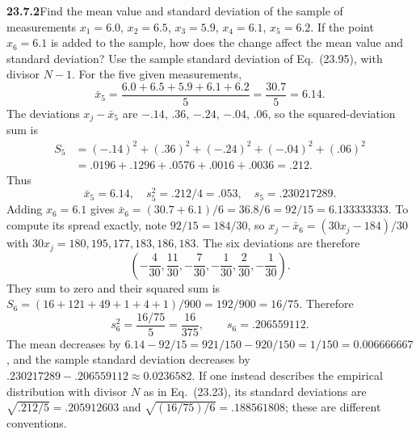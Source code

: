 \par\bigskip
\noindent\textbf{23.7.2}\quad Find the mean value and standard
deviation of the sample of measurements $x_{1}=6.0$,
$x_{2}=6.5$, $x_{3}=5.9$, $x_{4}=6.1$, $x_{5}=6.2$. If the point
$x_{6}=6.1$ is added to the sample, how does the change affect
the mean value and standard deviation?
\solution
Use the sample standard deviation of Eq.~(23.95), with divisor $N-1$.
For the five given measurements,
\[
\bar x_5=\frac{6.0+6.5+5.9+6.1+6.2}{5}
=\frac{30.7}{5}=6.14.
\]
The deviations $x_j-\bar x_5$ are $-.14$, $.36$, $-.24$, $-.04$, $.06$,
so the squared-deviation sum is
\[
\begin{aligned}
S_5&=(-.14)^2+(.36)^2+(-.24)^2+(-.04)^2+(.06)^2\\
&=.0196+.1296+.0576+.0016+.0036=.212.
\end{aligned}
\]
Thus
\[
\boxed{\bar x_5=6.14,\quad s_5^2=.212/4=.053,
\quad s_5=.230217289}.
\]
Adding $x_6=6.1$ gives $\bar x_6=(30.7+6.1)/6=36.8/6=92/15=6.133333333$.
To compute its spread exactly, note $92/15=184/30$, so
$x_j-\bar x_6=(30x_j-184)/30$ with $30x_j=180,195,177,183,186,183$.
The six deviations are therefore
\[
\left(-\frac4{30},\frac{11}{30},-\frac7{30},-\frac1{30},
\frac2{30},-\frac1{30}\right).
\]
They sum to zero and their squared sum is
$S_6=(16+121+49+1+4+1)/900=192/900=16/75$.
Therefore
\[
\boxed{s_6^2=\frac{16/75}{5}=\frac{16}{375},
\qquad s_6=.206559112}.
\]
The mean decreases by $6.14-92/15=921/150-920/150=1/150=0.006666667$,
and the sample standard deviation decreases by
$.230217289-.206559112\approx0.0236582$.
If one instead describes the empirical distribution with divisor $N$
as in Eq.~(23.23), its standard deviations are $\sqrt{.212/5}=.205912603$
and $\sqrt{(16/75)/6}=.188561808$; these are different conventions.


